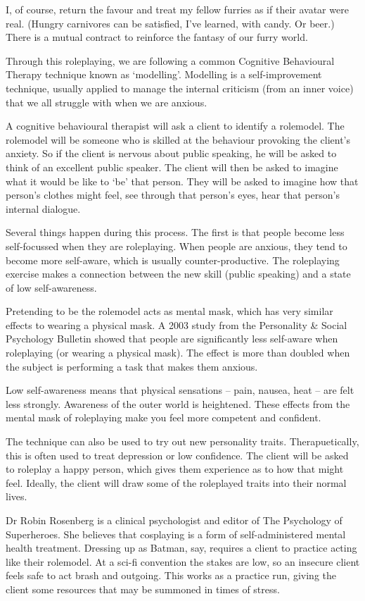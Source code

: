 I, of course, return the favour and treat my fellow furries as if their avatar were real. (Hungry carnivores can be satisfied, I've learned, with candy. Or beer.) There is a mutual contract to reinforce the fantasy of our furry world.

Through this roleplaying, we are following a common Cognitive Behavioural Therapy technique known as `modelling'. Modelling is a self-improvement technique, usually applied to manage the internal criticism (from an inner voice) that we all struggle with when we are anxious.

A cognitive behavioural therapist will ask a client to identify a rolemodel. The rolemodel will be someone who is skilled at the behaviour provoking the client's anxiety. So if the client is nervous about public speaking, he will be asked to think of an excellent public speaker. The client will then be asked to imagine what it would be like to `be' that person. They will be asked to imagine how that person's clothes might feel, see through that person's eyes, hear that person's internal dialogue.

Several things happen during this process. The first is that people become less self-focussed when they are roleplaying. When people are anxious, they tend to become more self-aware, which is usually counter-productive. The roleplaying exercise makes a connection between the new skill (public speaking) and a state of low self-awareness.

Pretending to be the rolemodel acts as mental mask, which has very similar effects to wearing a physical mask. A 2003 study from the Personality \& Social Psychology Bulletin showed that people are significantly less self-aware when roleplaying (or wearing a physical mask). The effect is more than doubled when the subject is performing a task that makes them anxious.

Low self-awareness means that physical sensations – pain, nausea, heat – are felt less strongly. Awareness of the outer world is heightened. These effects from the mental mask of roleplaying make you feel more competent and confident.

The technique can also be used to try out new personality traits. Therapuetically, this is often used to treat depression or low confidence. The client will be asked to roleplay a happy person, which gives them experience as to how that might feel. Ideally, the client will draw some of the roleplayed traits into their normal lives.

Dr Robin Rosenberg is a clinical psychologist and editor of The Psychology of Superheroes. She believes that cosplaying is a form of self-administered mental health treatment. Dressing up as Batman, say, requires a client to practice acting like their rolemodel. At a sci-fi convention the stakes are low, so an insecure client feels safe to act brash and outgoing. This works as a practice run, giving the client some resources that may be summoned in times of stress.

